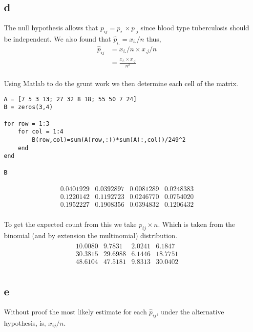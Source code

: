 \documentclass{article}
\begin{document}
\subsection{d}
The null hypothesis allows that $p_{ij} = p_{i.} \times p_{.j}$ since blood type
tuberculosis should be independent.
We also found that $\hat{p}_{i.} = x_{i.}/n$ thus,
\begin{align*}
    \hat{p}_{ij} &= x_{i.}/n \times x_{.j}/n \\
    &= \frac{x_{i.}\times x_{.j}}{n^2} \\
\end{align*}

Using Matlab to do the grunt work we then determine each cell of the matrix.
\begin{verbatim}
A = [7 5 3 13; 27 32 8 18; 55 50 7 24]
B = zeros(3,4)

for row = 1:3
    for col = 1:4
        B(row,col)=sum(A(row,:))*sum(A(:,col))/249^2
    end
end

B
\end{verbatim}

\begin{align*}
    \begin{matrix}
        0.0401929 & 0.0392897 & 0.0081289 & 0.0248383 \\
        0.1220142 & 0.1192723 & 0.0246770 & 0.0754020 \\
        0.1952227 & 0.1908356 & 0.0394832 & 0.1206432 \\
    \end{matrix}
\end{align*}

To get the expected count from this we take $p_{ij} \times n$. Which is taken
from the binomial (and by extension the multinomial) distribution.
\begin{align*}
    \begin{matrix}
        10.0080 &  9.7831 &  2.0241 &  6.1847 \\
        30.3815 & 29.6988 &  6.1446 & 18.7751 \\
        48.6104 & 47.5181 &  9.8313 & 30.0402 \\
    \end{matrix}
\end{align*}

\subsection{e}
Without proof the most likely estimate for each $\hat{p}_{ij}$, under the
alternative hypothesis, is, $x_{ij}/n$.
\end{document}
